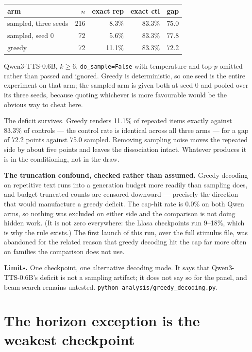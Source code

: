 \documentclass[11pt]{article}
\begin{document}
\begin{center}
\begin{tabular}{lrrrr}
\toprule
arm & $n$ & exact rep & exact ctl & gap \\
\midrule
sampled, three seeds & 216 & 8.3\%  & 83.3\% & 75.0 \\
sampled, seed 0      &  72 & 5.6\%  & 83.3\% & 77.8 \\
greedy               &  72 & 11.1\% & 83.3\% & 72.2 \\
\bottomrule
\end{tabular}
\end{center}

\noindent Qwen3-TTS-0.6B, $k\ge6$, \texttt{do\_sample=False} with temperature and
top-$p$ omitted rather than passed and ignored. Greedy is deterministic, so one
seed is the entire experiment on that arm; the sampled arm is given both at seed
0 and pooled over its three seeds, because quoting whichever is more favourable
would be the obvious way to cheat here.

The deficit survives. Greedy renders 11.1\% of repeated items exactly against
83.3\% of controls --- the control rate is identical across all three arms --- for
a gap of 72.2 points against 75.0 sampled. Removing sampling noise moves the
repeated side by about five points and leaves the dissociation intact. Whatever
produces it is in the conditioning, not in the draw.

\noindent\textbf{The truncation confound, checked rather than assumed.} Greedy
decoding on repetitive text runs into a generation budget more readily than
sampling does, and budget-truncated counts are censored downward --- precisely
the direction that would manufacture a greedy deficit. The cap-hit rate is
$0.0\%$ on both Qwen arms, so nothing was excluded on either side and the
comparison is not doing hidden work. (It is not zero everywhere: the Llasa
checkpoints run 9--18\%, which is why the rule exists.) The first launch of this
run, over the full stimulus file, was abandoned for the related reason that
greedy decoding hit the cap far more often on families the comparison does not
use.

\noindent\textbf{Limits.} One checkpoint, one alternative decoding mode. It says
that Qwen3-TTS-0.6B's deficit is not a sampling artifact; it does not say so for
the panel, and beam search remains untested. \texttt{python
analysis/greedy\_decoding.py}.


\section{The horizon exception is the weakest checkpoint}
\end{document}
